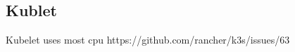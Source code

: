 \subsection{Kublet} \label{sec:kubelet}
Kubelet uses most cpu
https://github.com/rancher/k3s/issues/63